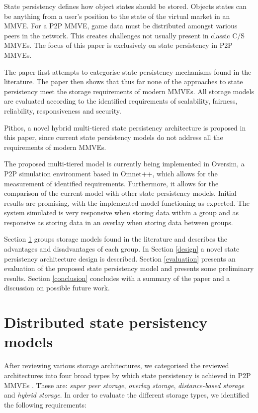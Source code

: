 \documentclass[10pt,a4paper,conference]{IEEEtran}
\begin{document}
State persistency defines how object states should be stored. Objects states can be anything from a user's position to the state of the virtual
market in an MMVE. For a P2P MMVE, game data must be distributed amongst various peers in the network. This creates challenges not usually present in
classic C/S MMVEs. The focus of this paper is exclusively on state persistency in P2P MMVEs.

The paper first attempts to categorise state persistency mechanisms found in the literature. The paper then shows that thus far none of the
approaches to state persistency meet the storage requirements of modern MMVEs. All storage models are evaluated according to the identified
requirements of scalability, fairness, reliability, responsiveness and security.

Pithos, a novel hybrid multi-tiered state persistency architecture is proposed in this paper, since current state persistency models do not address
all the requirements of modern MMVEs.

The proposed multi-tiered model is currently being implemented in Oversim, a P2P simulation environment based in Omnet++, which allows for the
measurement of identified requirements. Furthermore, it allows for the comparison of the current model with other state persistency models. Initial
results are promising, with the implemented model functioning as expected. The system simulated is very responsive when storing data within a group
and as responsive as storing data in an overlay when storing data between groups.

Section \ref{current_models} groups storage models found in the literature and describes the advantages and disadvantages of each group.
%
In Section \ref{design} a novel state persistency architecture design is described.
%
Section \ref{evaluation} presents an evaluation of the proposed state persistency model and presents some preliminary results.
%
Section \ref{conclusion} concludes with a summary of the paper and a discussion on possible future work.

\section{Distributed state persistency models}
\label{current_models}

After reviewing various storage architectures, we categorised the reviewed architectures into four broad types by which state persistency is achieved
in P2P MMVEs \cite{gilmore_p2p_mmog_state_persistency}. These are: \emph{super peer storage}, \emph{overlay storage}, \emph{distance-based storage}
and \emph{hybrid storage}. In order to evaluate the different storage types, we identified the following requirements:
\end{document}

